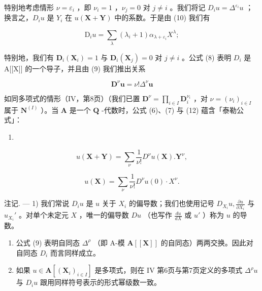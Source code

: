 特别地考虑情形 \(\nu = \varepsilon_{i}\) ，即 \(\nu_{i} = 1\) ，\(\nu_{j} = 0\) 对 \(j \neq i\) 。我们将记 \(D_{i}u = \Delta^{\varepsilon_{i}}u\) ；换言之，\(D_{i}u\) 是 \(Y_{i}\) 在 \(u(\mathbf{X} + \mathbf{Y})\) 中的系数。于是由 (10) 我们有

\[
\mathrm{D} _ {i} u = \sum_ {\lambda} (\lambda_ {i} + 1) \alpha_ {\lambda + \varepsilon_ {i}} X ^ {\lambda};\tag{11}
\]

特别地，我们有 \(\mathbf{D}_{i}(\mathbf{X}_{i})=1\) 与 \(\mathbf{D}_{i}(\mathbf{X}_{j})=0\) 对 \(j\neq i\) 。公式 (8) 表明 \(D_{i}\) 是 A{[}{[}X{]}{]} 的一个导子，并且由 (9) 我们推出关系

\[
\mathbf {D} ^ {\nu} \boldsymbol {u} = \nu ! \Delta^ {\nu} \boldsymbol {u}\tag{12}
\]

如同多项式的情形（IV，第8页）（我们已置 \(\mathbf{D}^{\nu} = \prod_{i\in I}\mathbf{D}_{i}^{\nu_{i}}\) ，对 \(\nu = (\nu_{i})_{i\in I}\) 属于 \(\mathbf{N}^{(I)}\) ）。当 \(\mathbf{A}\) 是一个 \(\mathbf{Q}\) -代数时，公式 (6)、(7) 与 (12) 蕴含「泰勒公式」：

\begin{enumerate}
\def\labelenumi{(\arabic{enumi})}
\setcounter{enumi}{12}
\tightlist
\item
\end{enumerate}

\[
u (\mathbf {X} + \mathbf {Y}) = \sum_ {\nu} \frac {1}{\nu !} D ^ {\nu} u (\mathbf {X}). \mathbf {Y} ^ {\nu},
\]

\[
u (\mathbf {X}) = \sum_ {\nu} \frac {1}{\nu !} D ^ {\nu} u (0) \cdot X ^ {\nu}.\tag{14}
\]

注记. --- 1) 我们常说 \(D_i u\) 是 \(u\) 关于 \(X_i\) 的偏导数；我们也使用记号 \(D_{X_i} u, \frac{\partial u}{\partial X_i}\) 与 \(u_{X_i}'\) 。对单个未定元 \(X\) ，唯一的偏导数 \(Du\) （也写作 \(\frac{du}{dX}\) 或 \(u'\) ）称为 \(u\) 的导数。

\begin{enumerate}
\def\labelenumi{\arabic{enumi})}
\setcounter{enumi}{1}
\item
  公式 (9) 表明自同态 \(\Delta^{\rho}\) （即 A-模 \(\mathbf{A}[[\mathbf{X}]]\) 的自同态）两两交换。因此对自同态 \(D_i\) 而言同样成立。
\item
  如果 \(u \in \mathbf{A}[(\mathbf{X}_i)_{i \in I}]\) 是多项式，则在 IV 第6页与第7页定义的多项式 \(\Delta^{\rho} u\) 与 \(D_i u\) 跟用同样符号表示的形式幂级数一致。
\end{enumerate}

